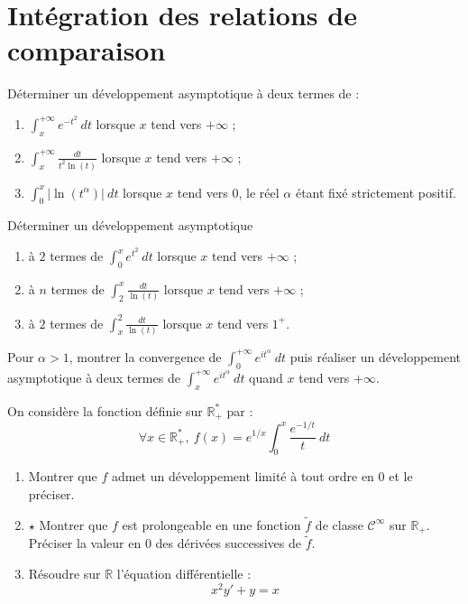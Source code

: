 \documentclass[french,a4paper]{article}
\newcommand{\R}{\mathbb{R}}
\newcommand{\st}{^*}
\theoremstyle{plain}
\theoremstyle{definition}
\theoremstyle{remark}
\begin{document}
\section{Intégration des relations de comparaison}

\begin{ex}[Moulin.IG.59]{}
	Déterminer un développement asymptotique à deux termes de :
	\begin{enumerate}
		\item $\displaystyle\int_{x}^{+\infty}e^{-t^2}\ dt$ lorsque $x$ tend vers $+\infty$ ;
		\item $\displaystyle\int_{x}^{+\infty}\frac{dt}{t^2\ln(t)}$ lorsque $x$ tend vers $+\infty$ ;
		\item $\displaystyle\int_{0}^{x}\lvert\ln(t^\alpha)\rvert\ dt$ lorsque $x$ tend vers $0$, le réel $\alpha$ étant fixé strictement positif.
	\end{enumerate}
\end{ex}

\begin{ex}[Moulin.IG.60]{}
	Déterminer un développement asymptotique
	\begin{enumerate}
		\item à $2$ termes de $\displaystyle\int_{0}^{x}e^{t^2}\ dt$ lorsque $x$ tend vers $+\infty$ ;
		\item à $n$ termes de $\displaystyle\int_{2}^{x}\frac{dt}{\ln(t)}$ lorsque $x$ tend vers $+\infty$ ;
		\item à $2$ termes de $\displaystyle\int_{x}^{2}\frac{dt}{\ln(t)}$ lorsque $x$ tend vers $1^+$.
	\end{enumerate}
\end{ex}

\begin{ex}[Moulin.IG.61]{}
	Pour $\alpha>1$, montrer la convergence de $\displaystyle\int_{0}^{+\infty}e^{it^\alpha}\ dt$ puis réaliser un développement asymptotique à deux termes de $\displaystyle\int_{x}^{+\infty}e^{it^\alpha}\ dt$ quand $x$ tend vers $+\infty$.
\end{ex}

\begin{ex}[Moulin.IG.62]{}
	On considère la fonction définie sur $\R_+\st$ par : $$\forall x\in\R_+\st,\ f(x)=e^{1/x}\int_{0}^{x}\frac{e^{-1/t}}{t}\ dt$$
	\begin{enumerate}
		\item Montrer que $f$ admet un développement limité à tout ordre en $0$ et le préciser.
		\item $\star$ Montrer que $f$ est prolongeable en une fonction $\tilde{f}$ de classe $\mathcal{C}^\infty$ sur $\R_+$. Préciser la valeur en $0$ des dérivées successives de $\tilde{f}$.
		\item Résoudre sur $\R$ l'équation différentielle : $$x^2y'+y=x$$
	\end{enumerate}
\end{ex}
\end{document}
